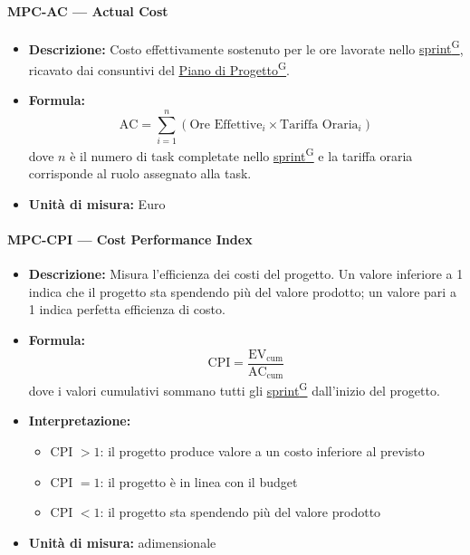 \documentclass[a4paper,12pt]{article}
\providecommand{\glslink}[2]{\href{https://alittlebyte-19.github.io/Documentazione/glossario.html\#gls-#1}{\underline{#2}\textsuperscript{\scriptsize G}}}
\begin{document}
\paragraph{MPC-AC --- Actual Cost}
\begin{itemize}
    \item \textbf{Descrizione:} Costo effettivamente sostenuto per le ore lavorate nello \glslink{sprint}{sprint}, ricavato dai consuntivi del \glslink{piano-di-progetto}{Piano di Progetto}.
    \item \textbf{Formula:}
    $$\text{AC} = \sum_{i=1}^{n} (\text{Ore Effettive}_i \times \text{Tariffa Oraria}_i)$$
    dove $n$ è il numero di task completate nello \glslink{sprint}{sprint} e la tariffa oraria corrisponde al ruolo assegnato alla task.
    \item \textbf{Unità di misura:} Euro
\end{itemize}

\paragraph{MPC-CPI --- Cost Performance Index}
\begin{itemize}
    \item \textbf{Descrizione:} Misura l'efficienza dei costi del progetto. Un valore inferiore a 1 indica che il progetto sta spendendo più del valore prodotto; un valore pari a 1 indica perfetta efficienza di costo.
    \item \textbf{Formula:}
    $$\text{CPI} = \frac{\text{EV}_{\text{cum}}}{\text{AC}_{\text{cum}}}$$
    dove i valori cumulativi sommano tutti gli \glslink{sprint}{sprint} dall'inizio del progetto.
    \item \textbf{Interpretazione:}
    \begin{itemize}
        \item CPI $> 1$: il progetto produce valore a un costo inferiore al previsto
        \item CPI $= 1$: il progetto è in linea con il budget
        \item CPI $< 1$: il progetto sta spendendo più del valore prodotto
    \end{itemize}
    \item \textbf{Unità di misura:} adimensionale
\end{itemize}
\end{document}
